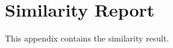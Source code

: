 %
%
%                 

\chapter{Similarity Report}
\label{sec:appendixb}

This appendix contains the similarity result. 

